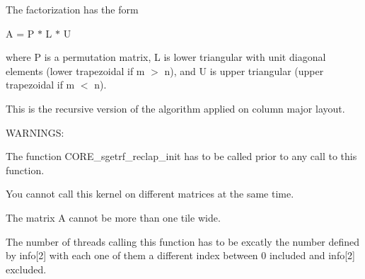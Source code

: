 The factorization has the form

A = P $\ast$ L $\ast$ U

where P is a permutation matrix, L is lower triangular with unit diagonal elements (lower trapezoidal if m $>$ n), and U is upper triangular (upper trapezoidal if m $<$ n).

This is the recursive version of the algorithm applied on column major layout.

W\+A\+R\+N\+I\+N\+G\+S\+:
\begin{DoxyItemize}
\item The function C\+O\+R\+E\+\_\+sgetrf\+\_\+reclap\+\_\+init has to be called prior to any call to this function.
\item You cannot call this kernel on different matrices at the same time.
\item The matrix A cannot be more than one tile wide.
\item The number of threads calling this function has to be excatly the number defined by info\mbox{[}2\mbox{]} with each one of them a different index between 0 included and info\mbox{[}2\mbox{]} excluded.
\end{DoxyItemize}


